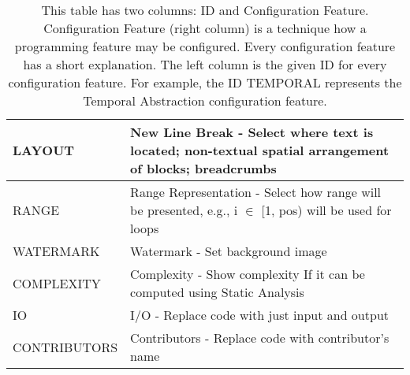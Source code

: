 \begin{table}[H]
\begin{tabular}{|l|p{14cm}|}
LAYOUT       & New Line Break - Select where text is located; non-textual spatial arrangement of blocks; breadcrumbs                              \\ \hline
RANGE        & Range Representation - Select how range will be presented, e.g., i $ \in $ {[}1, pos) will be used for loops                       \\ \hline
WATERMARK    & Watermark - Set background image                                                                                                   \\ \hline
COMPLEXITY   & Complexity - Show complexity If it can be computed using Static Analysis                                                              \\ \hline
IO           & I/O - Replace code with just input and output                                                                                      \\ \hline
CONTRIBUTORS & Contributors - Replace code with contributor's name                                                                                \\ \hline
\end{tabular}
\caption{This table has two columns: ID and Configuration Feature. Configuration Feature (right column) is a technique how a programming feature may be configured. Every configuration feature has a short explanation. The left column is the given ID for every configuration feature. For example, the ID TEMPORAL represents the Temporal Abstraction configuration feature.}
\label{tab14}
\end{table}
